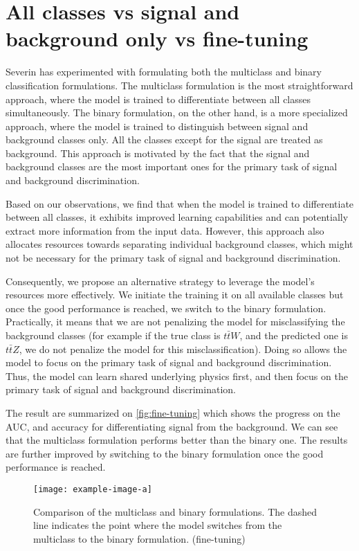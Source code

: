 \section{All classes vs signal and background only vs fine-tuning}
\label{sec:binary}


Severin has experimented with formulating both the multiclass and binary classification formulations. The multiclass
formulation is the most straightforward approach, where the model is trained to differentiate between all classes
simultaneously. The binary formulation, on the other hand, is a more specialized approach, where the model is trained to
distinguish between signal and background classes only. All the classes except for the signal are treated as background.
This approach is motivated by the fact that the signal and background classes are the most important ones for the
primary task of signal and background discrimination.

Based on our observations, we find that when the model is trained to differentiate between all classes, it exhibits
improved learning capabilities and can potentially extract more information from the input data. However, this approach
also allocates resources towards separating individual background classes, which might not be necessary for the primary
task of signal and background discrimination.

Consequently, we propose an alternative strategy to leverage the model's resources more effectively. We initiate the
training it on all available classes but once the good performance is reached, we switch to the binary formulation.
Practically, it means that we are not penalizing the model for misclassifying the background classes (for example if the
true class is $t\bar{t}W$, and the predicted one is $t\bar{t}Z$, we do not penalize the model for this
misclassification). Doing so allows the model to focus on the primary task of signal and background discrimination.
Thus, the model can learn shared underlying physics first, and then focus on the primary task of signal and background
discrimination.

The result are summarized on \autoref{fig:fine-tuning} which shows the progress on the AUC, and accuracy for
differentiating signal from the background.  We can see that the multiclass formulation performs better than the binary
one. The results are further improved by switching to the binary formulation once the good performance is reached.

\begin{figure}[htbp]
    \centering
    \texttt{[image: example-image-a]}
    \caption{Comparison of the multiclass and binary formulations. The dashed line indicates the point where the model
        switches from the multiclass to the binary formulation. (fine-tuning)}
    \label{fig:fine-tuning}
\end{figure}